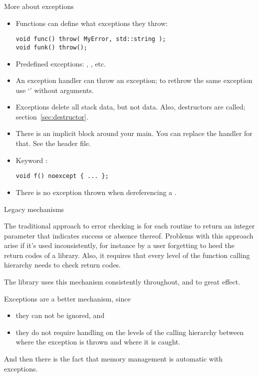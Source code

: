 \begin{block}{More about exceptions}
  \label{sl:exception-more}
  \begin{itemize}
  \item Functions can define what exceptions they throw: 
\begin{lstlisting}
void func() throw( MyError, std::string );
void funk() throw();
\end{lstlisting}
\item Predefined exceptions: ,
  , etc.
\item An exception handler can throw an exception; to rethrow the same
  exception use `' without arguments.
\item Exceptions delete all stack data, but not  data. Also,
  destructors are called; section~\ref{sec:destructor}.
\item There is an implicit  block around your
  main. You can replace the handler for that. See the
   header file.
\item Keyword :
\begin{lstlisting}
void f() noexcept { ... };
\end{lstlisting}
\item There is no exception thrown when dereferencing a .
  \end{itemize}
\end{block}

 {Legacy mechanisms}

The traditional approach to error checking is for each routine to
return an integer parameter that indicates success or absence
thereof. 
Problems with this approach arise if it's used inconsistently, for
instance by a user forgetting to heed the return codes of a library.
Also, it requires that every level of the function calling hierarchy
needs to check return codes.

The  library uses this mechanism
consistently throughout, and to great effect.

Exceptions are a better mechanism, since
\begin{itemize}
\item they can not be ignored, and
\item they do not require handling on the levels of the calling
  hierarchy between where the exception is thrown and where it is caught.
\end{itemize}
And then there is the fact that memory management is automatic with
exceptions.

